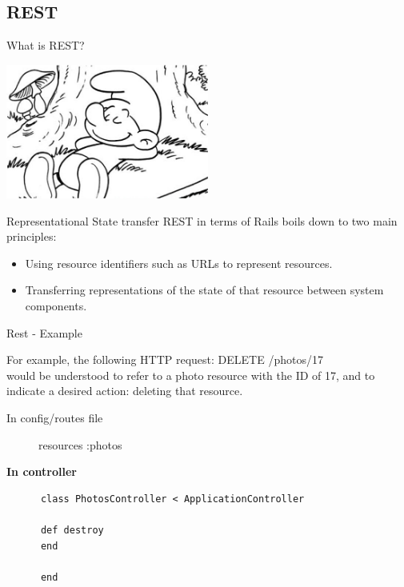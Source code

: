 \documentclass[xcolor=svgnames]{beamer}
\begin{document}
\subsection{REST}
\begin{frame}{What is REST?}
\transdissolve
\begin{center}
    \includegraphics[width=0.5\textwidth]{rest.jpg}
	\end{center}
\end{frame}
\begin{frame}{Representational State transfer}
  REST in terms of Rails boils down to two main principles:
	\begin{itemize}
		\item Using resource identifiers such as URLs to represent resources.
		 \item Transferring representations of the state of that resource between system components.

	\end{itemize}
	
\end{frame}
\begin{frame}[fragile]{Rest - Example}

For example, the following HTTP request: DELETE /photos/17 \\
would be understood to refer to a photo resource with the ID of 17, and to indicate a desired action:  deleting that resource. \\
\begin{description}
	\item[In config/routes file] resources :photos
\end{description}
	\textbf{In controller}
	\begin{verbatim}
	  class PhotosController < ApplicationController

	  def destroy
	  end
	  
	  end

	\end{verbatim}

	
\end{frame}
\end{document}
